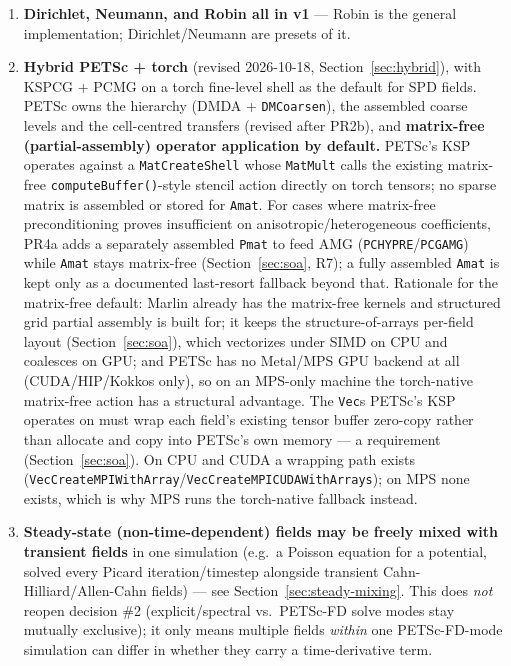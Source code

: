 \documentclass[11pt]{article}
\begin{document}
\begin{enumerate}[leftmargin=*]
policy, and the ``bump-only'' policy was a partial rebuild.
\item \textbf{Dirichlet, Neumann, and Robin all in v1} --- Robin is the
general implementation; Dirichlet/Neumann are presets of it.
\item \textbf{Hybrid PETSc + torch} (revised 2026-10-18,
Section~\ref{sec:hybrid}), with KSPCG + PCMG on a torch fine-level shell as
the default for SPD fields. PETSc owns the hierarchy (DMDA + \texttt{DMCoarsen}),
the assembled coarse levels and the cell-centred transfers (revised after PR2b), and \textbf{matrix-free (partial-assembly) operator
application by default.} PETSc's KSP operates against a \texttt{MatCreateShell} whose
\texttt{MatMult} calls the existing matrix-free \texttt{computeBuffer()}-style
stencil action directly on torch tensors; no sparse matrix is assembled or
stored for \texttt{Amat}. For cases where matrix-free preconditioning
proves insufficient on anisotropic/heterogeneous coefficients, PR4a adds a
separately assembled \texttt{Pmat} to feed AMG
(\texttt{PCHYPRE}/\texttt{PCGAMG}) while \texttt{Amat} stays matrix-free
(Section~\ref{sec:soa}, R7); a fully assembled \texttt{Amat} is kept only as
a documented last-resort fallback beyond that. Rationale for the
matrix-free default: Marlin already has the matrix-free kernels and
structured grid partial assembly is built for; it keeps the
structure-of-arrays per-field layout (Section~\ref{sec:soa}), which
vectorizes under SIMD on CPU and coalesces on GPU; and PETSc has no
Metal/MPS GPU backend at all (CUDA/HIP/Kokkos only), so on an MPS-only
machine the torch-native matrix-free action has a structural advantage.
The \texttt{Vec}s PETSc's KSP operates on must wrap each field's existing
tensor buffer zero-copy rather than allocate and copy into PETSc's own
memory --- a requirement (Section~\ref{sec:soa}). On CPU and CUDA a
wrapping path exists
(\texttt{VecCreateMPIWithArray}/\texttt{VecCreateMPICUDAWithArrays}); on MPS
none exists, which is why MPS runs the torch-native fallback instead.
\item \textbf{Steady-state (non-time-dependent) fields may be freely mixed
with transient fields} in one simulation (e.g.\ a Poisson equation for a
potential, solved every Picard iteration/timestep alongside transient
Cahn-Hilliard/Allen-Cahn fields) --- see Section~\ref{sec:steady-mixing}.
This does \textit{not} reopen decision \#2 (explicit/spectral vs.\ PETSc-FD
solve modes stay mutually exclusive); it only means multiple fields
\textit{within} one PETSc-FD-mode simulation can differ in whether they
carry a time-derivative term.
\end{enumerate}
\end{document}
